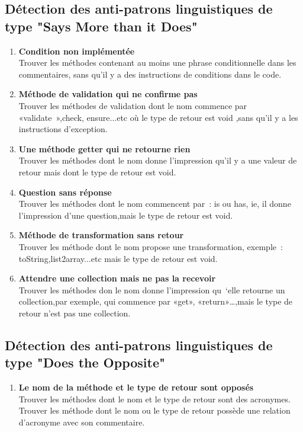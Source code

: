 \subsection{Détection des anti-patrons linguistiques de type "Says More than it Does"}
\begin{enumerate}
\item \textbf{Condition non implémentée}\\
Trouver les méthodes contenant au moins une phrase conditionnelle dans les commentaires, sans qu’il y a des instructions de conditions dans le code.
\item \textbf{Méthode de validation qui ne confirme pas}\\
Trouver les méthodes de validation dont le nom commence par «validate »,check, ensure...etc où le type de retour est void ,sans qu’il y a les instructions d’exception.
\item \textbf{Une méthode getter qui ne retourne rien}\\
Trouver les méthodes dont le nom donne l’impression qu’il y a une valeur de retour mais dont le type de retour est void.
\item \textbf {Question sans réponse}\\
Trouver les méthodes dont le nom commencent par : is ou has, ie, il donne l’impression d’une question,mais le type de retour est void.
\item \textbf{Méthode de transformation sans retour}\\
Trouver les méthode dont le nom propose une transformation, exemple : toString,list2array...etc mais le type de retour est void.
\item \textbf{Attendre une collection mais ne pas la recevoir}\\
Trouver les méthodes don le nom  donne l’impression qu ‘elle retourne un collection,par exemple, qui commence par «get», «return»…,mais le type de retour n’est pas une collection.
\end{enumerate}

\subsection{Détection des anti-patrons linguistiques de type "Does the Opposite"}
\begin{enumerate}
\item \textbf{Le nom de la méthode et le type de retour sont opposés}\\
Trouver les méthodes dont le nom et le type de retour sont des acronymes.
 \\
Trouver les méthode dont le nom ou le type de retour possède une relation d’acronyme avec son commentaire.
\end{enumerate}
